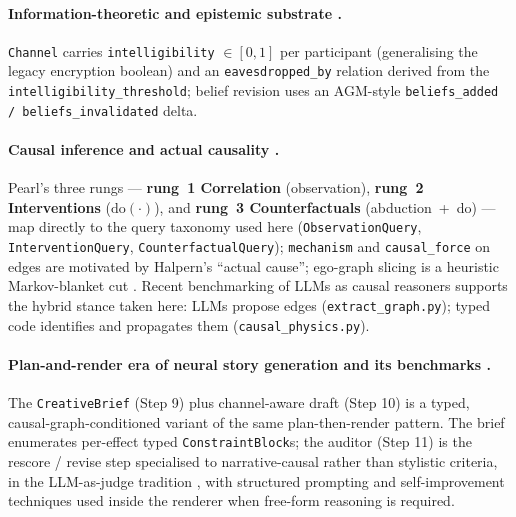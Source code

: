 \documentclass[11pt]{article}
\begin{document}
\paragraph{Information-theoretic and epistemic substrate
\citep{shannon1948mathematical,fagin1995reasoning,
alchourron1985agm}.} \texttt{Channel} carries
\texttt{intelligibility} $\in [0,1]$ per participant
(generalising the legacy encryption boolean) and an
\texttt{eavesdropped\_by} relation derived from the
\texttt{intelligibility\_threshold}; belief revision uses an
AGM-style \texttt{beliefs\_added / beliefs\_invalidated} delta.

\paragraph{Causal inference
\citep{pearl1995causal,pearl2009causality,pearl2018book,
spirtes2000causation,bareinboim2022pearl} and actual causality
\citep{halpern2005causes,halpern2016actual,woodward2003making}.}
Pearl's three rungs --- \textbf{rung~1 Correlation} (observation),
\textbf{rung~2 Interventions} ($\mathrm{do}(\cdot)$), and
\textbf{rung~3 Counterfactuals} (abduction~+~do) --- map directly
to the query taxonomy used here
(\texttt{ObservationQuery}, \texttt{InterventionQuery},
\texttt{CounterfactualQuery}); \texttt{mechanism} and
\texttt{causal\_force} on edges are motivated by Halpern's
``actual cause''; ego-graph slicing is a heuristic Markov-blanket
cut \citep{vermapearl1988dsep}. Recent benchmarking of LLMs as
causal reasoners \citep{kiciman2024causal} supports the hybrid
stance taken here: LLMs propose edges (\texttt{extract\_graph.py});
typed code identifies and propagates them
(\texttt{causal\_physics.py}).

\paragraph{Plan-and-render era of neural story generation
\citep{riedlyoung2010narrative,jhalayoung2010cinematic,
martin2018event,yao2019planwrite,goldfarbtarrant2020aristotelian,
rashkin2020plotmachines,yang2022re3,yang2023doc} and its
benchmarks \citep{mostafazadeh2016cloze,fan2018writingprompts,
akoury2020storium,tian2024human,xu2025echoes}.} The
\texttt{CreativeBrief} (Step 9) plus channel-aware draft
(Step 10) is a typed, causal-graph-conditioned variant of the same
plan-then-render pattern. The brief enumerates per-effect typed
\texttt{ConstraintBlock}s; the auditor (Step 11) is the rescore /
revise step \citep{goldfarbtarrant2020aristotelian,yang2022re3}
specialised to narrative-causal rather than stylistic criteria,
in the LLM-as-judge tradition \citep{zheng2023judge,
bai2022constitutional,madaan2023selfrefine,gu2024judge,
qi2023socratic}, with structured prompting and self-improvement
techniques \citep{wei2022cot,zelikman2022star} used inside the
renderer when free-form reasoning is required.
\end{document}
